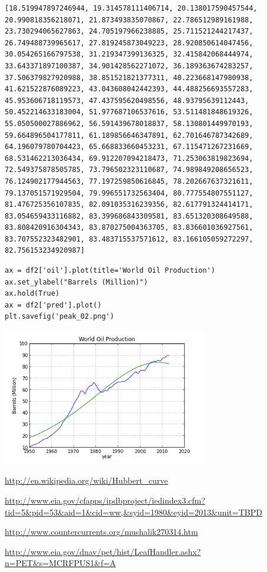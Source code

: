 \documentclass[12pt,fleqn]{article}\usepackage{../common}
\begin{document}
\begin{verbatim}
[18.519947897246944, 19.314578111406714, 20.138017590457544, 20.990818356218071, 21.873493835070867, 22.786512989161988, 23.730294065627863, 24.705197966238885, 25.711521244217437, 26.749488739965617, 27.819245873049223, 28.920850614047456, 30.054265166797538, 31.219347399136325, 32.415842068444974, 33.643371897100387, 34.901428562271072, 36.189363674283257, 37.506379827920988, 38.851521821377311, 40.223668147980938, 41.621522876089223, 43.043608042442393, 44.488256693557283, 45.953606718119573, 47.437595620498556, 48.93795639112443, 50.452214633183004, 51.977687106537616, 53.511481848619326, 55.050500027886962, 56.591439678018837, 58.130801449970193, 59.664896504177811, 61.189856646347891, 62.701646787342689, 64.196079780704423, 65.668833660453231, 67.115471267231669, 68.531462213036434, 69.912207094218473, 71.253063819823694, 72.549375878505785, 73.796502323110687, 74.989849208656523, 76.124902177944563, 77.197259850616845, 78.202667637321611, 79.137051571929504, 79.996551732563404, 80.777554807551127, 81.476725356107835, 82.091035316239356, 82.617791324414171, 83.054659433116882, 83.399686843309581, 83.651320308649588, 83.808420916304343, 83.870275004363705, 83.836601036927561, 83.707552323482901, 83.483715537571612, 83.166105059272297, 82.756153234920987]
\end{verbatim}

\begin{verbatim}
ax = df2['oil'].plot(title='World Oil Production')
ax.set_ylabel("Barrels (Million)")
ax.hold(True)
ax = df2['pred'].plot()
plt.savefig('peak_02.png')
\end{verbatim}

\includegraphics[height=6cm]{peak_02.png}

\url{http://en.wikipedia.org/wiki/Hubbert_curve}

\url{http://www.eia.gov/cfapps/ipdbproject/iedindex3.cfm?tid=5&pid=53&aid=1&cid=ww,&syid=1980&eyid=2013&unit=TBPD}

\url{http://www.countercurrents.org/mushalik270314.htm}

\url{http://www.eia.gov/dnav/pet/hist/LeafHandler.ashx?n=PET&s=MCRFPUS1&f=A}
\end{document}
